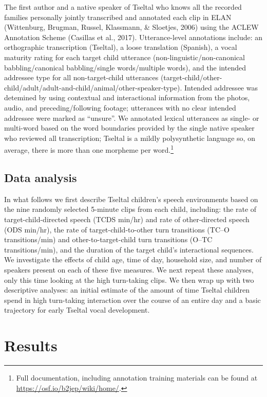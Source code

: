 \documentclass[floatsintext,man]{apa6}
\theoremstyle{definition}
\theoremstyle{definition}
\theoremstyle{definition}
\theoremstyle{remark}
\begin{document}
The first author and a native speaker of Tseltal who knows all the
recorded families personally jointly transcribed and annotated each clip
in ELAN (Wittenburg, Brugman, Russel, Klassmann, \& Sloetjes, 2006)
using the ACLEW Annotation Scheme (Casillas et al., 2017).
Utterance-level annotations include: an orthographic transcription
(Tseltal), a loose translation (Spanish), a vocal maturity rating for
each target child utterance (non-linguistic/non-canonical
babbling/canonical babbling/single words/multiple words), and the
intended addressee type for all non-target-child utterances
(target-child/other-child/adult/adult-and-child/animal/other-speaker-type).
Intended addressee was detemined by using contextual and interactional
information from the photos, audio, and preceding/following footage;
utterances with no clear intended addressee were marked as
\enquote{unsure}. We annotated lexical utterances as single- or
multi-word based on the word boundaries provided by the single native
speaker who reviewed all transcription; Tseltal is a mildly
polysynthetic language so, on average, there is more than one morpheme
per word.\footnote{Full documentation, including annotation training
  materials can be found at \url{https://osf.io/b2jep/wiki/home/}.}

\subsection{Data analysis}\label{methods-analysisinfo}

In what follows we first describe Tseltal children's speech environments
based on the nine randomly selected 5-minute clips from each child,
including: the rate of target-child-directed speech (TCDS min/hr) and
rate of other-directed speech (ODS min/hr), the rate of
target-child-to-other turn transitions (TC--O transitions/min) and
other-to-target-child turn transitions (O--TC transitions/min), and the
duration of the target child's interactional sequences. We investigate
the effects of child age, time of day, household size, and number of
speakers present on each of these five measures. We next repeat these
analyses, only this time looking at the high turn-taking clips. We then
wrap up with two descriptive analyses: an initial estimate of the amount
of time Tseltal children spend in high turn-taking interaction over the
course of an entire day and a basic trajectory for early Tseltal vocal
development.

\section{Results}\label{results}
\end{document}
